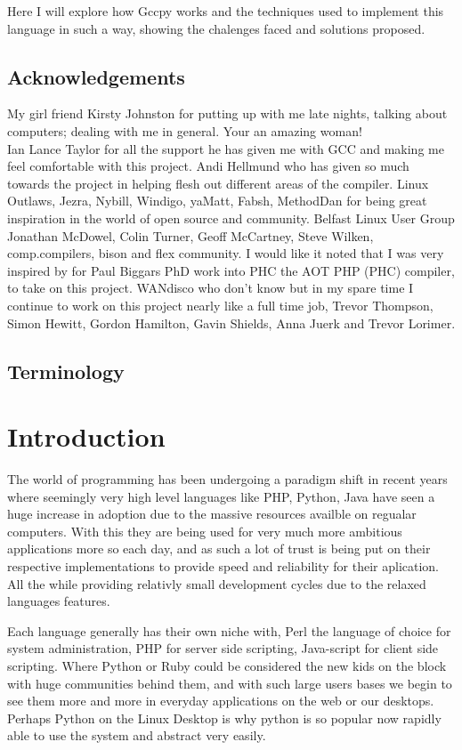 \documentclass[defaultstyle,11pt]{article}
\begin{document}
Here I will explore how Gccpy works and the techniques used to implement this language in such a way,
showing the chalenges faced and solutions proposed.

\subsection{Acknowledgements}
My girl friend Kirsty Johnston for putting up with me late nights, talking about computers; dealing with me in general.
Your an amazing woman!\\
Ian Lance Taylor for all the support he has given me with GCC and making me feel comfortable
with this project. Andi Hellmund who has given so much towards the project in helping flesh out different areas of the compiler.
Linux Outlaws, Jezra, Nybill, Windigo, yaMatt, Fabsh, MethodDan for being great inspiration in the world
of open source and community. Belfast Linux User Group Jonathan McDowel,
Colin Turner, Geoff McCartney, Steve Wilken, comp.compilers, bison and flex community. 
I would like it noted that I was very inspired by for Paul Biggars PhD work into PHC the AOT PHP (PHC) compiler,
to take on this project. WANdisco who don't know but in my spare time I continue to work on this project nearly
like a full time job, Trevor Thompson, Simon Hewitt, Gordon Hamilton, Gavin Shields, Anna Juerk and Trevor Lorimer.

\subsection{Terminology}

\section{Introduction}

The world of programming has been undergoing a paradigm shift in recent years where seemingly very high level
languages like PHP, Python, Java have seen a huge increase in adoption due to the massive resources availble on
regualar computers. With this they are being used for very much more ambitious applications more so each day,
and as such a lot of trust is being put on their respective implementations to provide speed and reliability for
their aplication. All the while providing relativly small development cycles due to the relaxed languages features.

Each language generally has their own niche with, Perl the language of choice for system administration,
PHP for server side scripting, Java-script for client side scripting. Where Python or Ruby could be considered
the new kids on the block with huge communities behind them, and with such large users bases we begin to see
them more and more in everyday applications on the web or our desktops. Perhaps Python on the Linux Desktop
is why python is so popular now rapidly able to use the system and abstract very easily.
\end{document}
